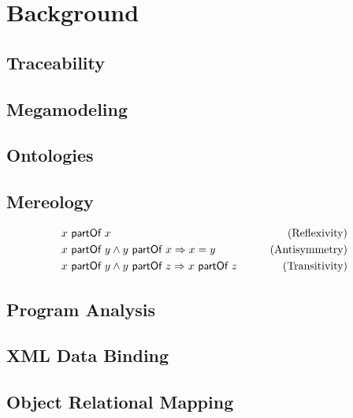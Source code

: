 \chapter{Background}
\lipsum[1]

\section{Traceability}
\lipsum[1]

\section{Megamodeling}
\lipsum[1]

\section{Ontologies}
\lipsum[1]

\section{Mereology}
\begin{align}
&x ~\textsf{partOf}~ x 
&\qquad \text{(Reflexivity)}
\\&x ~\textsf{partOf}~ y \wedge y ~\textsf{partOf}~ x \Rightarrow x = y
&\qquad \text{(Antisymmetry)}
\\&x ~\textsf{partOf}~ y \wedge y ~\textsf{partOf}~ z \Rightarrow x ~\textsf{partOf}~ z
&\qquad \text{(Transitivity)}
\end{align}
\lipsum[1]

\section{Program Analysis}
\lipsum[1]

\section{XML Data Binding}
\lipsum[1]

\section{Object Relational Mapping}
\lipsum[1]
